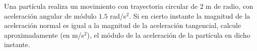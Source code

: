 Una partícula realiza un movimiento con trayectoria circular de $2$ m de radio, con aceleración angular de módulo $1.5$ rad/s$^{2}$. Si en cierto instante la magnitud de la aceleración normal es igual a la magnitud de la aceleración  tangencial, calcule aproximadamente (en m/s$^{2}$), el módulo de la aceleración de la partícula en dicho instante.
